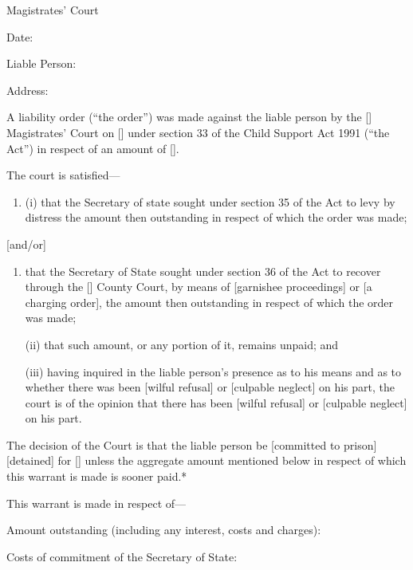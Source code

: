 \documentclass[a4paper]{article}
\begin{document}
\medskip

{\raggedleft \hspace{0.5\linewidth}\dotfill Magistrates' Court

}

\medskip

Date:

\medskip

Liable Person:

\medskip

Address:

\medskip

A liability order (``the order'') was made against the liable person by the [\phantom{Bolton}] Magistrates' Court on [\phantom{\today}] under section 33 of the Child Support Act 1991 (``the Act'') in respect of an amount of [\phantom{£100.00}].

The court is satisfied---
\begin{enumerate}
\item[]
(i) that the Secretary of state sought under section 35 of the Act to levy by distress the amount then outstanding in respect of which the order was made;
\end{enumerate}
[and/or]
\begin{enumerate}\item[]
that the Secretary of State sought under section 36 of the Act to recover through the [\phantom{Bolton}] County Court, by means of [garnishee proceedings] or [a charging order], the amount then outstanding in respect of which the order was made;

(ii) that such amount, or any portion of it, remains unpaid; and

(iii) having inquired in the liable person's presence as to his means and as to whether there was been [wilful refusal] or [culpable neglect] on his part, the court is of the opinion that there has been [wilful refusal] or [culpable neglect] on his part.
\end{enumerate}

The decision of the Court is that the liable person be [committed to prison] [detained] for [\phantom{7 days}] unless the aggregate amount mentioned below in respect of which this warrant is made is sooner paid.*

\medskip

This warrant is made in respect of---

Amount outstanding (including any interest, costs and charges):

Costs of commitment of the Secretary of State:
\end{document}
